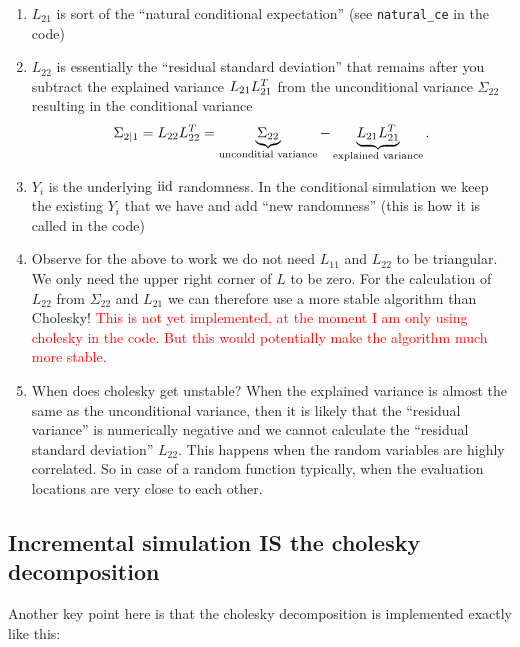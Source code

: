 \begin{enumerate}
    \item \(L_{21}\) is sort of the ``natural conditional expectation'' (see \texttt{natural\_ce} in the code)
    \item \(L_{22}\) is essentially the ``residual standard deviation''
    that remains after you subtract the explained variance \(L_{21}L_{21}^T\)
    from the unconditional variance \(\Sigma_{22}\) resulting in the conditional
    variance
    \[
        \Sigma_{2\mid 1} = L_{22}L_{22}^T = \underbrace{\Sigma_{22}}_{\text{unconditial variance}} - \underbrace{L_{21}L_{21}^T}_{\text{explained variance}}.
    \]
    \item \(Y_i\) is the underlying \(\mathrm{iid}\) randomness. In the conditional simulation
    we keep the existing \(Y_i\) that we have and add ``new randomness'' (this is
    how it is called in the code)

    \item Observe for the above to work we do not need \(L_{11}\) and \(L_{22}\)
    to be triangular. We only need the upper right corner of \(L\) to be zero.
    For the calculation of \(L_{22}\) from \(\Sigma_{22}\) and \(L_{21}\)
    we can therefore use a more stable algorithm than Cholesky!
    \textcolor{red}{This is not yet implemented, at the moment I am only using
    cholesky in the code. But this would potentially make the algorithm much
    more stable.}

    \item When does cholesky get unstable? When the explained variance is almost
    the same as the unconditional variance, then it is likely that the ``residual variance''
    is numerically negative and we cannot calculate the ``residual standard deviation''
    \(L_{22}\). This happens when the random variables are highly correlated.
    So in case of a random function typically, when the evaluation locations are
    very close to each other.
\end{enumerate}

\subsection{Incremental simulation IS the cholesky decomposition}

Another key point here is that the cholesky decomposition is implemented
exactly like this:

